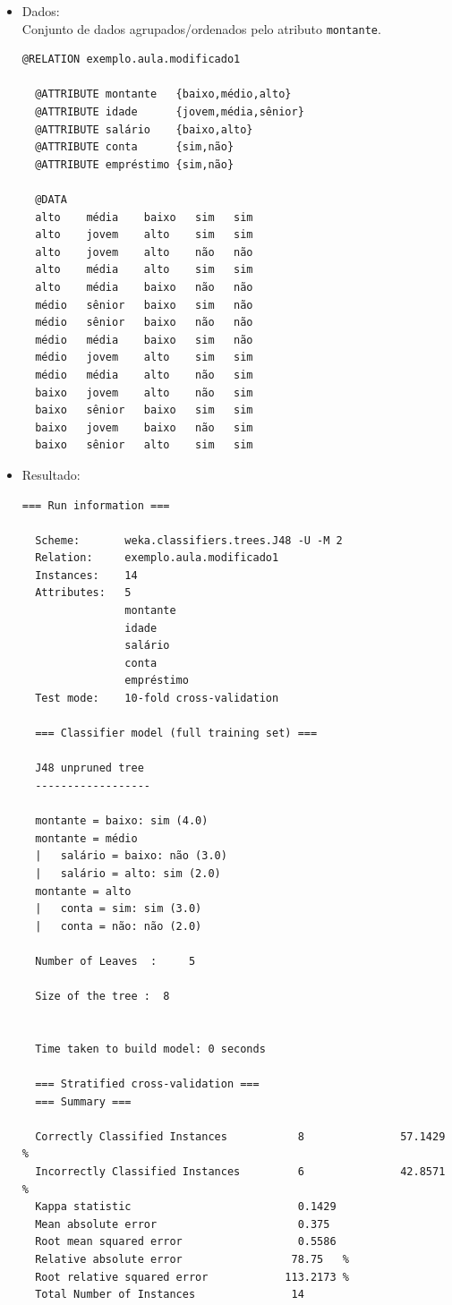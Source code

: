 \documentclass[
    article,            %
    11pt,               %
    oneside,            %
    a4paper,            %
    english,            %
    brazil,             %
    sumario=tradicional,
    ]{abntex2}
\begin{document}
\begin{itemize}
  \item Dados:\\
  Conjunto de dados agrupados/ordenados pelo atributo \texttt{montante}.
  \begin{Verbatim}[frame=single, fontsize=\tiny]
  @RELATION exemplo.aula.modificado1

  @ATTRIBUTE montante   {baixo,médio,alto}
  @ATTRIBUTE idade      {jovem,média,sênior}
  @ATTRIBUTE salário    {baixo,alto}
  @ATTRIBUTE conta      {sim,não}
  @ATTRIBUTE empréstimo {sim,não}

  @DATA
  alto    média    baixo   sim   sim 
  alto    jovem    alto    sim   sim 
  alto    jovem    alto    não   não 
  alto    média    alto    sim   sim 
  alto    média    baixo   não   não 
  médio   sênior   baixo   sim   não 
  médio   sênior   baixo   não   não 
  médio   média    baixo   sim   não 
  médio   jovem    alto    sim   sim 
  médio   média    alto    não   sim 
  baixo   jovem    alto    não   sim 
  baixo   sênior   baixo   sim   sim 
  baixo   jovem    baixo   não   sim 
  baixo   sênior   alto    sim   sim 
  \end{Verbatim}

  \item Resultado:
  \begin{Verbatim}[frame=single, fontsize=\tiny]
  === Run information ===

  Scheme:       weka.classifiers.trees.J48 -U -M 2
  Relation:     exemplo.aula.modificado1
  Instances:    14
  Attributes:   5
                montante
                idade
                salário
                conta
                empréstimo
  Test mode:    10-fold cross-validation

  === Classifier model (full training set) ===

  J48 unpruned tree
  ------------------

  montante = baixo: sim (4.0)
  montante = médio
  |   salário = baixo: não (3.0)
  |   salário = alto: sim (2.0)
  montante = alto
  |   conta = sim: sim (3.0)
  |   conta = não: não (2.0)

  Number of Leaves  :     5

  Size of the tree :  8


  Time taken to build model: 0 seconds

  === Stratified cross-validation ===
  === Summary ===

  Correctly Classified Instances           8               57.1429 %
  Incorrectly Classified Instances         6               42.8571 %
  Kappa statistic                          0.1429
  Mean absolute error                      0.375 
  Root mean squared error                  0.5586
  Relative absolute error                 78.75   %
  Root relative squared error            113.2173 %
  Total Number of Instances               14     


\end{Verbatim}
\end{itemize}
\end{document}
